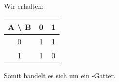Wir erhalten:

\begin{tabular}{c|cc}
	A \textbackslash{} B & 0 & 1 \\
	\hline
	0 & 1 & 1 \\
	1 & 1 & 0
\end{tabular}

Somit handelt es sich um ein \tnand-Gatter.


\FloatBarrier
\IfFileExists{\bibliographyfile}{
	
}{}



